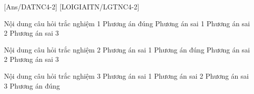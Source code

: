 \begin{vd}
	
	\loigiai{}
\end{vd}

\begin{vd}
	
	\loigiai{}
\end{vd}

\begin{vd}
	
	\loigiai{}
\end{vd}

\begin{vd}
	
	\loigiai{}
\end{vd}
\newpage
\begin{bttl}
\end{bttl}
[Ans/DATNC4-2]
\luuloigiaiex
{}[LOIGIAITN/LGTNC4-2]
\begin{ex}
	Nội dung câu hỏi trắc nghiệm 1
	\choice
	{\True Phương án đúng}
	{ Phương án sai 1}
	{Phương án sai 2}
	{Phương án sai 3}
\end{ex}
\begin{ex}
	Nội dung câu hỏi trắc nghiệm 2
	\choice
	{Phương án sai 1}
	{\True Phương án đúng}
	{Phương án sai 2}
	{Phương án sai 3}
\end{ex}
\begin{ex}
	Nội dung câu hỏi trắc nghiệm 3
	\choice
	{Phương án sai 1}
	{Phương án sai 2}
	{Phương án sai 3}
	{\True Phương án đúng}
\end{ex}

